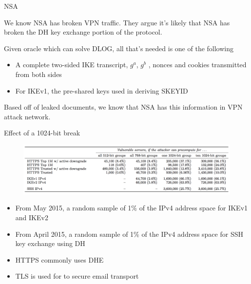 \documentclass[presentation, aspectratio=54]{beamer}
\begin{document}

\begin{frame}{NSA}

We know NSA has broken VPN traffic. They argue it's likely that NSA has broken
the DH key exchange portion of the protocol. 

Given oracle which can solve DLOG, all that's needed is one of the following
\begin{itemize}
\item A complete two-sided IKE transcript, $g^a$, $g^b$ , nonces and cookies
      transmitted from both sides
\item For IKEv1, the pre-shared keys used in deriving SKEYID
\end{itemize}

Based off of leaked documents, we know that NSA has this information in VPN
attack network.

\end{frame}


\begin{frame}{Effect of a 1024-bit break}

\begin{figure}
\centering
\includegraphics[width=\columnwidth]{graphics/Vulnerabilites.png}
\end{figure}

\begin{itemize}
\item From May 2015, a random sample of 1\% of the IPv4 address space for
      IKEv1 and IKEv2
\item From April 2015, a random sample of 1\% of the IPv4 address space for
      SSH key exchange using DH
\item HTTPS commonly uses DHE
\item TLS is used for to secure email transport
\end{itemize}

\end{frame}
\end{document}
